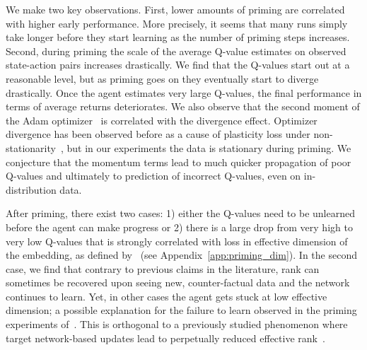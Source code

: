 We make two key observations. First, lower amounts of priming are correlated with higher early performance. More precisely, it seems that many runs simply take longer before they start learning as the number of priming steps increases. Second, during priming the scale of the average Q-value estimates on observed state-action pairs increases drastically. We find that the Q-values start out at a reasonable level, but as priming goes on they eventually start to diverge drastically. Once the agent estimates very large Q-values, the final performance in terms of average returns deteriorates. We also observe that the second moment of the Adam optimizer~\parencite{kingma2015adam} is correlated with the divergence effect. Optimizer divergence has been observed before as a cause of plasticity loss under non-stationarity~\parencite{lyle2023understanding}, but in our experiments the data is stationary during priming. We conjecture that the momentum terms lead to much quicker propagation of poor Q-values and ultimately to prediction of incorrect Q-values, even on in-distribution data.


After priming, there exist two cases: 1) either the Q-values need to be unlearned before the agent can make progress or 2) there is a large drop from very high to very low Q-values that is strongly correlated with loss in effective dimension of the embedding, as defined by~\cite{yang2020harnessing} (see Appendix~\ref{app:priming_dim}). In the second case, we find that contrary to previous claims in the literature, rank can sometimes be recovered upon seeing new, counter-factual data and the network continues to learn. Yet, in other cases the agent gets stuck at low effective dimension; a possible explanation for the failure to learn observed in the priming experiments of~\textcite{nikishin2022primacy}. This is orthogonal to a previously studied phenomenon where target network-based updates lead to perpetually reduced effective rank~\parencite{kumar2021implicit}.


